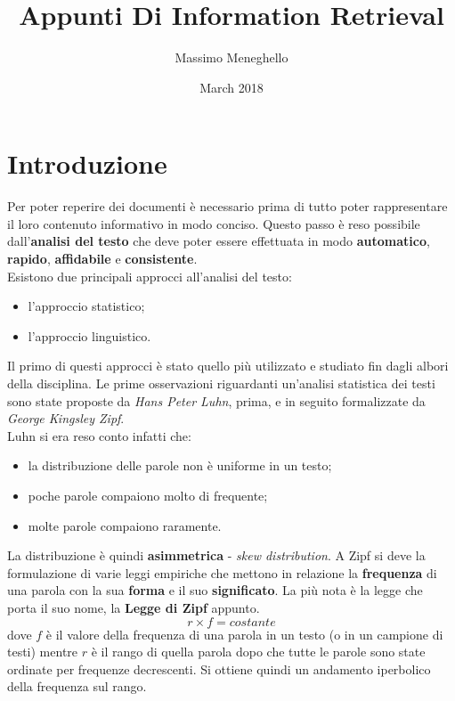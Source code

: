 \documentclass{article}
\title{Appunti Di Information Retrieval}
\author{Massimo Meneghello}
\date{March 2018}
\begin{document}
\maketitle

\tableofcontents

\section{Introduzione}
Per poter reperire dei documenti è necessario prima di tutto poter rappresentare il loro contenuto informativo in modo conciso. Questo passo è reso possibile dall'\textbf{analisi del testo} che deve poter essere effettuata in modo \textbf{automatico}, \textbf{rapido}, \textbf{affidabile} e \textbf{consistente}.\\
Esistono due principali approcci all'analisi del testo:
\begin{itemize}
\item l'approccio statistico;
\item l'approccio linguistico.
\end{itemize}
Il primo di questi approcci è stato quello più utilizzato e studiato fin dagli albori della disciplina. Le prime osservazioni riguardanti un'analisi statistica dei testi sono state proposte da \textit{Hans Peter Luhn}, prima, e in seguito formalizzate da \textit{George Kingsley Zipf}.\\
Luhn si era reso conto infatti che:
\begin{itemize}
\item la distribuzione delle parole non è uniforme in un testo;
\item poche parole compaiono molto di frequente;
\item molte parole compaiono raramente.
\end{itemize}
La distribuzione è quindi \textbf{asimmetrica} - \textit{skew distribution}.
A Zipf si deve la formulazione di varie leggi empiriche che mettono in relazione la \textbf{frequenza} di una parola con la sua \textbf{forma} e il suo \textbf{significato}. La più nota è la legge che porta il suo nome, la \textbf{Legge di Zipf} appunto.
\begin{equation}
r \times f = costante
\end{equation}
dove $f$ è il valore della frequenza di una parola in un testo (o in un campione di testi) mentre $r$ è il rango di quella parola dopo che tutte le parole sono state ordinate per frequenze decrescenti. Si ottiene quindi un andamento iperbolico della frequenza sul rango.\\
\end{document}

